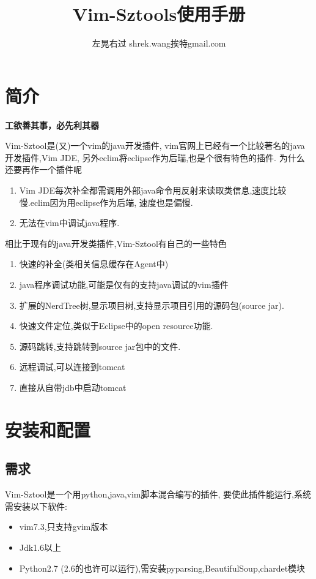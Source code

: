 \documentclass[oneside,openany]{book}
\title{Vim-Sztools使用手册}
\author{左晃右过 shrek.wang挨特gmail.com}
\begin{document}
\maketitle

\chapter{简介}

  \begin{center}
    \large\textbf{工欲善其事，必先利其器}
  \end{center}

  Vim-Sztool是(又)一个vim的java开发插件, vim官网上已经有一个比较著名的java开发插件,Vim JDE, 
  另外eclim将eclipse作为后瑞,也是个很有特色的插件. 为什么还要再作一个插件呢
  \begin{enumerate}
    \item Vim JDE每次补全都需调用外部java命令用反射来读取类信息,速度比较慢.eclim因为用eclipse作为后端, 速度也是偏慢.
    \item 无法在vim中调试java程序.
  \end{enumerate}

  相比于现有的java开发类插件,Vim-Sztool有自己的一些特色
  \begin{enumerate}
    \item 快速的补全(类相关信息缓存在Agent中)
    \item java程序调试功能,可能是仅有的支持java调试的vim插件
    \item 扩展的NerdTree树,显示项目树,支持显示项目引用的源码包(source jar).
    \item 快速文件定位,类似于Eclipse中的open resource功能.
    \item 源码跳转,支持跳转到source jar包中的文件.
    \item 远程调试,可以连接到tomcat
    \item 直接从自带jdb中启动tomcat
  \end{enumerate}

\chapter{安装和配置}
  \section{需求}
  Vim-Sztool是一个用python,java,vim脚本混合编写的插件, 要使此插件能运行,系统需安装以下软件:
    \begin{itemize}
      \item vim7.3,只支持gvim版本
      \item Jdk1.6以上
      \item Python2.7 (2.6的也许可以运行),需安装pyparsing,BeautifulSoup,chardet模块
    \end{itemize}
\end{document}
